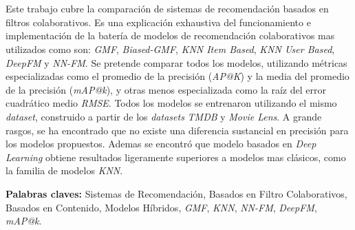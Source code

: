 \chapter*{\runtitulo}

\noindent Este trabajo cubre la comparación de sistemas de recomendación basados en filtros colaborativos. Es una explicación exhaustiva del funcionamiento e implementación de la batería de modelos de recomendación colaborativos mas utilizados como son: \textit{GMF}, \textit{Biased-GMF}, \textit{KNN Item Based}, \textit{KNN User Based}, \textit{DeepFM} y \textit{NN-FM}. Se pretende comparar todos los modelos, utilizando métricas especializadas como el promedio de la precisión (\textit{AP@K}) y la media del promedio de la precisión (\textit{mAP@k}), y otras menos especializada como la raíz del error cuadrático medio \textit{RMSE}. Todos los modelos se entrenaron utilizando el mismo \textit{dataset}, construido a partir de los \textit{datasets} \textit{TMDB} y \textit{Movie Lens}. A grande rasgos, se ha encontrado que no existe una diferencia sustancial en precisión para los modelos propuestos. Ademas se encontró que modelo basados en \textit{Deep Learning} obtiene resultados ligeramente superiores a modelos mas clásicos, como la familia de modelos \textit{KNN}.

\bigskip

\noindent\textbf{Palabras claves:} Sistemas de Recomendación, Basados en Filtro Colaborativos, Basados en Contenido, Modelos Híbridos, \textit{GMF}, \textit{KNN}, \textit{NN-FM}, \textit{DeepFM}, \textit{mAP@k}.
